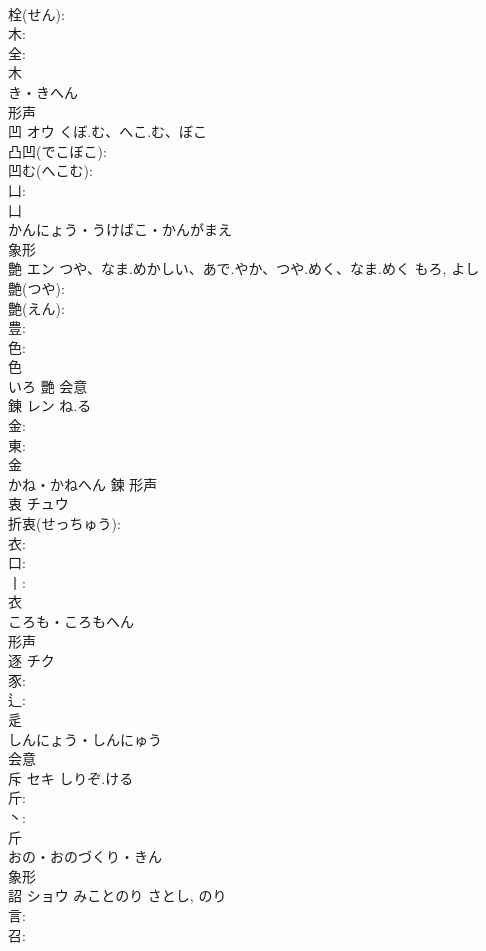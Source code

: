 \documentclass[8pt]{extreport}
\begin{document}
\begin{CJK}{UTF8}{min}
\\	栓(せん): 
\\	木: 
\\	全: 
\\	木	
\\	き・きへん	
\\	形声 
\\	凹	オウ	くぼ.む、へこ.む、ぼこ		
\\	凸凹(でこぼこ): 
\\	凹む(へこむ): 
\\	凵: 
\\	凵	
\\	かんにょう・うけばこ・かんがまえ	
\\	象形 
\\	艶	エン	つや、なま.めかしい、あで.やか、つや.めく、なま.めく	もろ, よし	
\\	艶(つや): 
\\	艶(えん): 
\\	豊: 
\\	色: 
\\	色	
\\	いろ	艷	会意 
\\	錬	レン	ね.る		
\\	金: 
\\	東: 
\\	金	
\\	かね・かねへん	鍊	形声 
\\	衷	チュウ			
\\	折衷(せっちゅう): 
\\	衣: 
\\	口: 
\\	丨: 
\\	衣	
\\	ころも・ころもへん	
\\	形声 
\\	逐	チク			
\\	豕: 
\\	辶: 
\\	辵	
\\	しんにょう・しんにゅう	
\\	会意 
\\	斥	セキ	しりぞ.ける		
\\	斤: 
\\	丶: 
\\	斤	
\\	おの・おのづくり・きん	
\\	象形 
\\	詔	ショウ	みことのり	さとし, のり	
\\	言: 
\\	召: 

\end{CJK}
\end{document}
